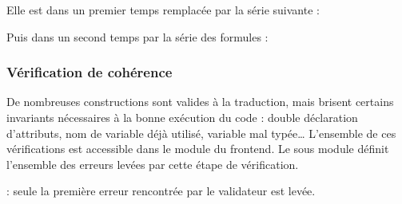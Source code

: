 \documentclass[letterpaper,10pt,french]{sphinxmanual}
\begin{document}
\begin{sphinxVerbatim}[commandchars=\\\{\}]
        
      
\end{sphinxVerbatim}

\sphinxAtStartPar
Elle est dans un premier temps remplacée par la série suivante :

\begin{sphinxVerbatim}[commandchars=\\\{\}]
    
      
 
    
      
\end{sphinxVerbatim}

\sphinxAtStartPar
Puis dans un second temps par la série des formules :

\begin{sphinxVerbatim}[commandchars=\\\{\}]
    
    
    
    
\end{sphinxVerbatim}


\subsubsection{Vérification de cohérence}
\label{\detokenize{mlang:verification-de-coherence}}
\sphinxAtStartPar
De nombreuses constructions sont valides à la traduction, mais brisent
certains invariants nécessaires à la bonne exécution du code : double
déclaration d’attributs, nom de variable déjà utilisé, variable mal
typée…
L’ensemble de ces vérifications est accessible dans le module
 du frontend. Le sous module  définit l’ensemble
des erreurs levées par cette étape de vérification.

\sphinxAtStartPar
{} : seule la première erreur rencontrée par le validateur est levée.
\end{document}
